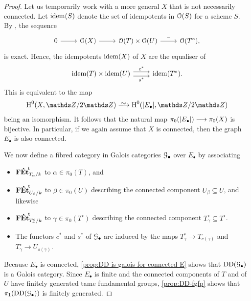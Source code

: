 \begin{proof}
Let us temporarily work with a more general $X$ that is not necessarily connected. Let $\operatorname{idem}(S)$ denote the set of idempotents in ${\mathcal O}(S)$ for a scheme $S$. By \cite[Theorem~2.2]{ArtinFormalModuliII}, the sequence 
\[ 
    \begin{tikzcd}
        0 \ar[r] &\cO(X) \ar[r] &  \cO(T)\times \cO(U) \ar[r,"-"] &\cO(T^\circ),
    \end{tikzcd}
\]
is exact. Hence, the 
idempotents $\operatorname{idem}(X)$ of $X$ are the equaliser of 
\[
\begin{tikzcd}
        \idem(T) \times \idem(U) \ar[r,"c^\ast",shift left=0.7ex] \ar[r,"s^\ast",swap,shift right=0.7ex] 
        & \idem(T^\circ) .
    \end{tikzcd}
\]
This is equivalent to the map 
\[
\rH^0(X,\bZ/2\bZ) \isomto \rH^0(|E_\bullet|,\bZ/2\bZ)
\]
being an isomorphism. It follows that the natural map $\pi_0(|E_\bullet|) \longrightarrow \pi_0(X)$
is bijective. In particular, if we again assume that $X$ is connected, then the graph $E_\bullet$ is also connected.


We now define a fibred category in Galois categories ${\mathcal G}_\bullet$ over $E_\bullet$ by associating 
\begin{itemize}
    \item 
    ${\mathbf{F\acute{E}t}}^{\!\mathrm{t}}_{T_\alpha/k}$ to $\alpha \in \pi_0(T)$, and
    \item ${\mathbf{F\acute{E}t}}^{\!\mathrm{t}}_{U_\beta/k}$ to $\beta \in \pi_0(U)$ describing the connected component $U_\beta \subseteq U$, and likewise
    \item 
    ${\mathbf{F\acute{E}t}}^{\!\mathrm{t}}_{T^\circ_\gamma/k}$ to $\gamma \in \pi_0(T^\circ)$ describing the connected component $T^\circ_\gamma \subseteq T^\circ$. 
    \item 
    The functors $c^*$ and $s^*$ of ${\mathcal G}_\bullet$ are induced by the maps 
    $T^\circ_\gamma\to T_{c(\gamma)}$ and $T^\circ_\gamma\to U_{s(\gamma)}$. 
\end{itemize}
Because $E_\bullet$ is connected, \cref{prop:DD is galois for connected E} shows that $\operatorname{DD}({\mathcal G}_\bullet)$ is a Galois category. Since $E_\bullet$ is finite and the connected components of $T$ and of $U$ have finitely generated tame fundamental groups, \cref{prop:DD-fgfp} shows that $\pi_1(\operatorname{DD}({\mathcal G}_\bullet))$ is finitely generated. 


\end{proof}
